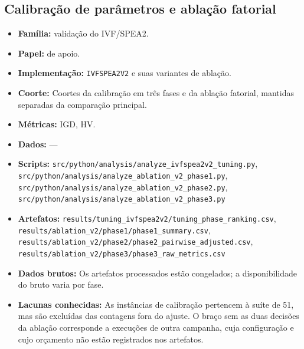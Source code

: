 \subsection*{Calibração de parâmetros e ablação fatorial}
\begin{itemize}[nosep]\raggedright
    \item \textbf{Família:} validação do IVF/SPEA2.
    \item \textbf{Papel:} de apoio.
    \item \textbf{Implementação:} \texttt{IVFSPEA2V2} e suas variantes de ablação.
    \item \textbf{Coorte:} Coortes da calibração em três fases e da ablação fatorial, mantidas separadas da comparação principal.
    \item \textbf{Métricas:} IGD, HV.
    \item \textbf{Dados:} ---
    \item \textbf{Scripts:} \texttt{src/\allowbreak{}python/\allowbreak{}analysis/\allowbreak{}analyze\_\allowbreak{}ivfspea2v2\_\allowbreak{}tuning.py}, \texttt{src/\allowbreak{}python/\allowbreak{}analysis/\allowbreak{}analyze\_\allowbreak{}ablation\_\allowbreak{}v2\_\allowbreak{}phase1.py}, \texttt{src/\allowbreak{}python/\allowbreak{}analysis/\allowbreak{}analyze\_\allowbreak{}ablation\_\allowbreak{}v2\_\allowbreak{}phase2.py}, \texttt{src/\allowbreak{}python/\allowbreak{}analysis/\allowbreak{}analyze\_\allowbreak{}ablation\_\allowbreak{}v2\_\allowbreak{}phase3.py}
    \item \textbf{Artefatos:} \texttt{results/\allowbreak{}tuning\_\allowbreak{}ivfspea2v2/\allowbreak{}tuning\_\allowbreak{}phase\_\allowbreak{}ranking.csv}, \texttt{results/\allowbreak{}ablation\_\allowbreak{}v2/\allowbreak{}phase1/\allowbreak{}phase1\_\allowbreak{}summary.csv}, \texttt{results/\allowbreak{}ablation\_\allowbreak{}v2/\allowbreak{}phase2/\allowbreak{}phase2\_\allowbreak{}pairwise\_\allowbreak{}adjusted.csv}, \texttt{results/\allowbreak{}ablation\_\allowbreak{}v2/\allowbreak{}phase3/\allowbreak{}phase3\_\allowbreak{}raw\_\allowbreak{}metrics.csv}
    \item \textbf{Dados brutos:} Os artefatos processados estão congelados; a disponibilidade do bruto varia por fase.
    \item \textbf{Lacunas conhecidas:} As instâncias de calibração pertencem à suíte de 51, mas são excluídas das contagens fora do ajuste. O braço sem as duas decisões da ablação corresponde a execuções de outra campanha, cuja configuração e cujo orçamento não estão registrados nos artefatos.
\end{itemize}

